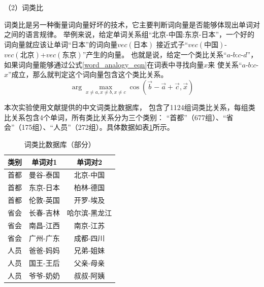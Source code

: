 \documentclass{standalone}
\begin{document}
（2）词类比

词类比是另一种衡量词向量好坏的技术，它主要判断词向量是否能够体现出单词对之间的语言规律。
举例来说，给定单词关系组“北京-中国:东京-日本”，一个好的词向量就应该让单词“日本”的词向量$vec\left(\mbox{日本}\right)$
接近式子“$vec\left(\mbox{中国}\right)$-$vec\left(\mbox{北京}\right)$+$vec\left(\mbox{东京}\right)$”产生的向量。
也就是说，给定一个类比关系“$a$-$b$:$c$-$d$”，如果词向量能够通过公式\ref{word_analogy_eqn}在词表中寻找向量$x$来
使关系“$a$-$b$:$c$-$x$”成立，那么就判定这个词向量包含这个类比关系。
\begin{equation}
    \arg \max_{x\neq a,x\neq b,x\neq c}\cos \left ( \vec{b}-\vec{a}+\vec{c},\vec{x} \right )
    \label{word_analogy_eqn}
\end{equation}

本次实验使用文献\cite{chen2015joint}提供的中文词类比数据库，
包含了1124组词类比关系，每组类比关系包含4个单词，所有类比关系分为三个类别：
“首都”（677组）、“省会”（175组）、“人员”（272组）。具体数据如表\ref{word_analogy_table}所示。
\begin{table}[ht]
    \caption{词类比数据库（部分）}
    \begin{tabular}{|c|c|c|}
        \hline
        类别 & 单词对1 & 单词对2 \\
        \hline
        首都 & 曼谷-泰国 & 北京-中国 \\
        \hline
        首都 & 东京-日本 & 柏林-德国 \\
        \hline
        首都 & 伦敦-英国 & 开罗-埃及 \\
        \hline
        省会 & 长春-吉林 & 哈尔滨-黑龙江 \\
        \hline
        省会 & 南昌-江西 & 南京-江苏 \\
        \hline
        省会 & 广州-广东 & 成都-四川 \\
        \hline
        人员 & 爸爸-妈妈 & 兄弟-姐妹 \\
        \hline
        人员 & 国王-王后 &  父亲-母亲\\
        \hline
        人员 & 爷爷-奶奶 & 叔叔-阿姨 \\
        \hline
    \end{tabular}
    \label{word_analogy_table}
    \end{table}
\end{document}
